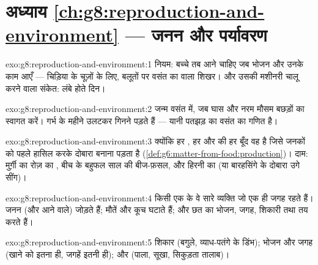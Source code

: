 \section*{अध्याय \ref{ch:g8:reproduction-and-environment} --- जनन और पर्यावरण}

\begin{solution}{exo:g8:reproduction-and-environment:1}
नियम: बच्चे तब आने चाहिए जब भोजन और  उनके काम आएँ ---
चिड़िया के चूज़ों के लिए, बलूतों पर वसंत का  वाला शिखर। और उसकी
मशीनरी चालू करने वाला संकेत: लंबे होते दिन।
\end{solution}

\begin{solution}{exo:g8:reproduction-and-environment:2}
जन्म वसंत में, जब घास और नरम मौसम बछड़ों का स्वागत करें। गर्भ के महीने
उलटकर गिनने पड़ते हैं --- यानी पतझड़ का  वसंत का गणित है।
\end{solution}

\begin{solution}{exo:g8:reproduction-and-environment:3}
क्योंकि हर , हर  और  की हर बूँद वह  है जिसे
जनकों को पहले हासिल करके दोबारा बनाना पड़ता है
(\cref{def:g6:matter-from-food:production})। दाम: मुर्ग़ी का रोज़ का
, बीच के बहुफल साल की बीज-फ़सल, और हिरनी का  (या बारहसिंगे के
दोबारा उगे सींग)।
\end{solution}

\begin{solution}{exo:g8:reproduction-and-environment:4}
किसी एक  के वे सारे व्यक्ति जो एक ही जगह रहते हैं। जनन (और आने
वाले) जोड़ते हैं; मौतें और कूच घटाते हैं; और छत  का भोजन, जगह,
शिकारी तथा  तय करते हैं।
\end{solution}

\begin{solution}{exo:g8:reproduction-and-environment:5}
शिकार (बगुले, व्याध-पतंगे के डिंभ); भोजन और जगह (खाने को इतना ही,
जगहें इतनी ही); और  (पाला, सूखा, सिकुड़ता तालाब)।
\end{solution}

